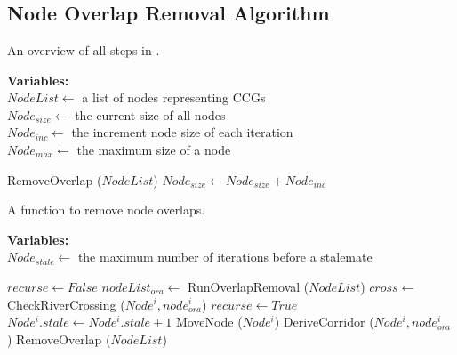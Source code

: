 \section{\software}

\subsection{Node Overlap Removal Algorithm}

\begin{algorithm}[hbt!]
    \caption{An overview of all steps in \software.}\label{alg:overview}
    \textbf{Variables:} \\
    $NodeList \gets$ a list of nodes representing CCGs \\
    $Node_{size}\gets$ the current size of all nodes \\
    $Node_{inc} \gets$ the increment node size of each iteration \\
    $Node_{max} \gets$ the maximum size of a node \\

    \begin{algorithmic}[1]
            \State RemoveOverlap ($ NodeList $)
            \State $Node_{size} \gets Node_{size} + Node_{inc}$
        \EndWhile
    \end{algorithmic}
\end{algorithm}

\begin{algorithm}[hbt!]
    \caption{A function to remove node overlaps.}\label{alg:remove overlap}
    \textbf{Variables:} \\
    $Node_{stale} \gets$ the maximum number of iterations before a stalemate \\
    \begin{algorithmic}[1]
        \State $ recurse \gets False$
        \State $ nodeList_{ora} \gets $ RunOverlapRemoval ($ NodeList $)
                    \State $ cross \gets $ CheckRiverCrossing ($ Node^i, node^i_{ora} $)
                        \State $recurse \gets True$
                        \State $ Node^i.stale \gets Node^i.stale + 1 $
                            \State MoveNode ($ Node^i $)
                        \Else
                            \State DeriveCorridor ($ Node^i, node^i_{ora} $)
                        \EndIf
                    \EndIf
                \EndIf
            \EndFor
                \State RemoveOverlap ($ NodeList $)
            \EndIf
        \EndFunction
    \end{algorithmic}
\end{algorithm}


